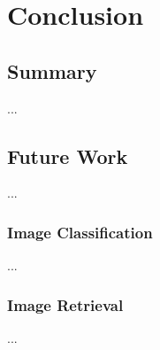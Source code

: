 
\lhead[\chaptername~\thechapter]{\rightmark}

\rhead[\leftmark]{}

\lfoot[\thepage]{}

\cfoot{}

\rfoot[]{\thepage}

\chapter{Conclusion}
\label{conclusion}


\section{Summary}

...

\section{Future Work}

...

\subsection*{Image Classification}

...

\subsection*{Image Retrieval}

...

